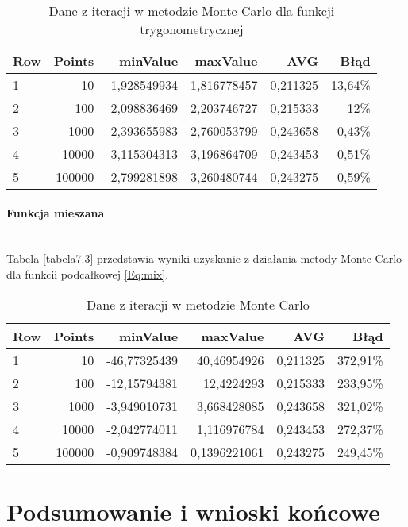 \documentclass[12pt,twoside]{article}
\begin{document}
\begin{table}[H]
\centering 
\caption{Dane z iteracji w metodzie Monte Carlo dla funkcji trygonometrycznej}
\label{tabela7.2}
\begin{tabular}{lrrrrr}
\toprule
{Row} &  Points &  minValue &  maxValue &       AVG &      Błąd \\
\midrule
1  &     10 & -1,928549934 &   1,816778457 & 0,211325 & 13,64\% \\
2  &     100 & -2,098836469 &  2,203746727 & 0,215333 & 12\% \\
3  &     1000 & -2,393655983 &   2,760053799 & 0,243658 & 0,43\% \\
4  &     10000 & -3,115304313 &  3,196864709 & 0,243453 & 0,51\% \\
5  &     100000 & -2,799281898 &  3,260480744 & 0,243275 & 0,59\% \\
\bottomrule
\end{tabular}
\end{table}

\paragraph{Funkcja mieszana}\mbox{} \\

Tabela \eqref{tabela7.3} przedstawia wyniki uzyskanie z działania metody Monte Carlo dla funkcii podcałkowej \eqref{Eq:mix}.

\begin{table}[H]
\centering 
\caption{Dane z iteracji w metodzie Monte Carlo}
\label{tabela7.3}
\begin{tabular}{lrrrrr}
\toprule
{Row} &  Points &  minValue &  maxValue &       AVG &      Błąd \\
\midrule
1  &     10 & -46,77325439 &   40,46954926 & 0,211325 & 372,91\% \\
2  &     100 & -12,15794381 &  12,4224293 & 0,215333 & 233,95\% \\
3  &     1000 & -3,949010731 &   3,668428085 & 0,243658 & 321,02\% \\
4  &     10000 & -2,042774011 &  1,116976784 & 0,243453 & 272,37\% \\
5  &     100000 & -0,909748384 &  0,1396221061 & 0,243275 & 249,45\% \\
\bottomrule
\end{tabular}
\end{table}



\section{Podsumowanie i wnioski końcowe}
\end{document}
